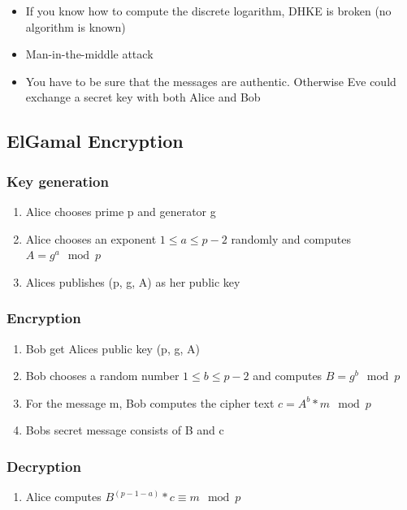 \begin{itemize}
    \item If you know how to compute the discrete logarithm, DHKE is broken (no algorithm is known)
    \item Man-in-the-middle attack
    \item You have to be sure that the messages are authentic. Otherwise Eve could exchange a secret key with both Alice and Bob
\end{itemize} 

\subsection{ElGamal Encryption}
\subsubsection{Key generation}
\begin{enumerate}
    \item Alice chooses prime p and generator g
    \item Alice chooses an exponent $1 \leqslant a \leqslant p - 2$ randomly and computes $A = g^a \mod p$
    \item Alices publishes (p, g, A) as her public key
\end{enumerate}

\subsubsection{Encryption}
\begin{enumerate}
    \item Bob get Alices public key (p, g, A)
    \item Bob chooses a random number $1 \leqslant b \leqslant p - 2$ and computes $B = g^b \mod p$
    \item For the message m, Bob computes the cipher text $c = A^b * m \mod p$
    \item Bobs secret message consists of B and c
\end{enumerate}

\subsubsection{Decryption}
\begin{enumerate}
    \item Alice computes $B^{(p - 1 - a)} * c \equiv m \mod p$
\end{enumerate}

